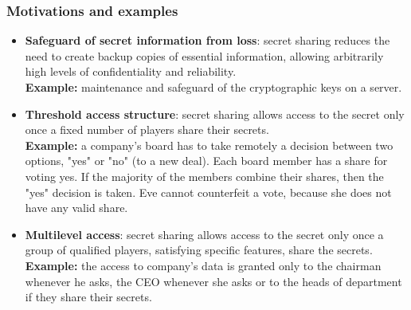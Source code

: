 \documentclass[a4paper, 10pt, titlepage]{article}
\begin{document}
\subsubsection*{Motivations and examples}
\begin{itemize}
\item \textbf{Safeguard of secret information from loss}: secret sharing reduces the need to create backup copies of essential information, allowing arbitrarily high levels of confidentiality and reliability. \\
\textbf{Example:} maintenance and safeguard of the cryptographic keys on a server.
\item \textbf{Threshold access structure}: secret sharing allows access to the secret only once a fixed number of players share their secrets.\\
\textbf{Example:} a company’s board has to take remotely a decision between two options, "yes" or "no" (to a new deal). Each board member has a share for voting yes. If the majority of the members combine their shares, then the "yes" decision is taken. Eve cannot counterfeit a vote, because she does not have any valid share.
\item \textbf{Multilevel access}: secret sharing allows access to the secret only once a group of qualified players, satisfying specific features, share the secrets.\\
\textbf{Example:} the access to company’s data is granted only to the chairman whenever he asks, the CEO whenever she asks or to the heads of department if they share their secrets.
\end{itemize}
\end{document}

